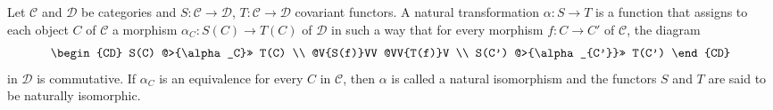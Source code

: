 Let $\mathcal{C}$ and $\mathcal{D}$ be categories and $S : \mathcal{C} \to \mathcal{D}$, $T : \mathcal{C} \to \mathcal{D}$ covariant functors. A natural transformation $\alpha : S \to T$ is a function that assigns to each object $C$ of $\mathcal{C}$ a morphism $\alpha_C : S(C) \to T(C)$ of $\mathcal{D}$ in such a way that for every morphism $f : C \to C'$ of $\mathcal{C}$, the diagram
\[
\begin{CD}
S(C) @>{\alpha_C}>> T(C) \\
@V{S(f)}VV @VV{T(f)}V \\
S(C') @>{\alpha_{C'}}>> T(C')
\end{CD}
\]
in $\mathcal{D}$ is commutative. If $\alpha_C$ is an equivalence for every $C$ in $\mathcal{C}$, then $\alpha$ is called a natural isomorphism and the functors $S$ and $T$ are said to be naturally isomorphic.
